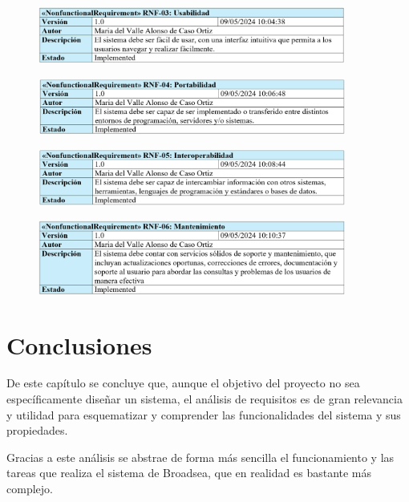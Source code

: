 \begin{figure}[H]
    \centering
    \includegraphics[width=0.90\textwidth]{tables/RNF03.png}
    \label{fig:RNF03}
\end{figure}

\begin{figure}[H]
    \centering
    \includegraphics[width=0.90\textwidth]{tables/RNF04.png}
    \label{fig:RNF04}
\end{figure}

\begin{figure}[H]
    \centering
    \includegraphics[width=0.90\textwidth]{tables/RNF05.png}
    \label{fig:RNF05}
\end{figure}

\begin{figure}[H]
    \centering
    \includegraphics[width=0.90\textwidth]{tables/RNF06.png}
    \label{fig:RNF06}
\end{figure}

\section{Conclusiones} \label{sec:06conclusiones}

De este capítulo se concluye que, aunque el objetivo del proyecto no sea específicamente diseñar un sistema, el análisis de requisitos es de gran relevancia y utilidad  para esquematizar y comprender las funcionalidades del sistema y sus propiedades.

Gracias a este análisis se abstrae de forma más sencilla el funcionamiento y las tareas que realiza el sistema de Broadsea, que en realidad es bastante más complejo.
